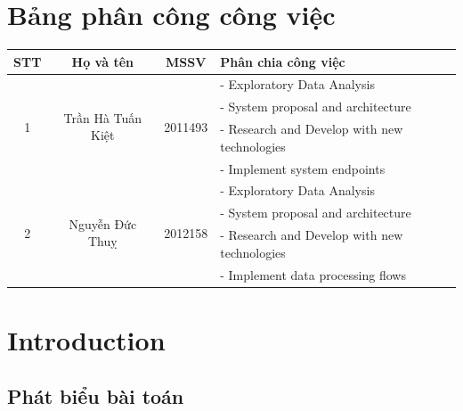 \documentclass[12pt, a4paper]{report}
\theoremstyle{definition}
\begin{document}
\chapter*{Bảng phân công công việc}
\begin{table}[H]
  \centering
  \renewcommand{\arraystretch}{1.5}
  \begin{tabular}{|c|c|c|l|}
    \hline
    \textbf{STT}       & \textbf{Họ và tên}                 & \textbf{MSSV}            & \textbf{Phân chia công việc}                 \\
    \hline
    \multirow{4}{*}{1} & \multirow{4}{*}{Trần Hà Tuấn Kiệt} & \multirow{4}{*}{2011493} & - Exploratory Data Analysis                  \\
                       &                                    &                          & - System proposal and architecture           \\
                       &                                    &                          & - Research and Develop with new technologies \\
                       &                                    &                          & - Implement system endpoints                 \\
    \hline
    \multirow{4}{*}{2} & \multirow{4}{*}{Nguyễn Đức Thuỵ}   & \multirow{4}{*}{2012158} & - Exploratory Data Analysis                  \\
                       &                                    &                          & - System proposal and architecture           \\
                       &                                    &                          & - Research and Develop with new technologies \\
                       &                                    &                          & - Implement data processing flows            \\
    \hline
  \end{tabular}
\end{table}
\newpage
\tableofcontents
\newpage
\listoffigures
\listoftables
\chapter{Introduction}
\section{Phát biểu bài toán}

\end{document}
